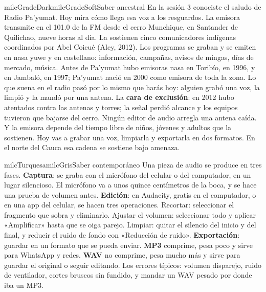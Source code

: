 \documentclass[11pt,letterpaper]{article}
\begin{document}
\begin{softbox}{milcGradeDark}{milcGradeSoft}{Saber ancestral}
En la sesión 3 conociste el saludo de Radio Pa'yumat. Hoy mira cómo llega esa voz a los resguardos. La emisora transmite en el 101.0 de la FM desde el cerro Munchique, en Santander de Quilichao, nueve horas al día. La sostienen cinco comunicadores indígenas coordinados por Abel Coicué (Aley, 2012). Los programas se graban y se emiten en nasa yuwe y en castellano: información, campañas, avisos de mingas, días de mercado, música. Antes de Pa'yumat hubo emisoras nasa en Toribío, en 1996, y en Jambaló, en 1997; Pa'yumat nació en 2000 como emisora de toda la zona. Lo que suena en el radio pasó por lo mismo que harás hoy: alguien grabó una voz, la limpió y la mandó por una antena. La \textbf{cara de exclusión}: en 2012 hubo atentados contra las antenas y torres; la señal perdió alcance y los equipos tuvieron que bajarse del cerro. Ningún editor de audio arregla una antena caída. Y la emisora depende del tiempo libre de niños, jóvenes y adultos que la sostienen. Hoy vas a grabar una voz, limpiarla y exportarla en dos formatos. En el norte del Cauca esa cadena se sostiene bajo amenaza.\par{}
\end{softbox}

\begin{softbox}{milcTurquesa}{milcGris}{Saber contemporáneo}
Una pieza de audio se produce en tres fases. \textbf{Captura}: se graba con el micrófono del celular o del computador, en un lugar silencioso. El micrófono va a unos quince centímetros de la boca, y se hace una prueba de volumen antes. \textbf{Edición}: en Audacity, gratis en el computador, o en una app del celular, se hacen tres operaciones. Recortar: seleccionar el fragmento que sobra y eliminarlo. Ajustar el volumen: seleccionar todo y aplicar «Amplificar» hasta que se oiga parejo. Limpiar: quitar el silencio del inicio y del final, y reducir el ruido de fondo con «Reducción de ruido». \textbf{Exportación}: guardar en un formato que se pueda enviar. \textbf{MP3} comprime, pesa poco y sirve para WhatsApp y redes. \textbf{WAV} no comprime, pesa mucho más y sirve para guardar el original o seguir editando. Los errores típicos: volumen disparejo, ruido de ventilador, cortes bruscos sin fundido, y mandar un WAV pesado por donde iba un MP3.
\end{softbox}
\end{document}
